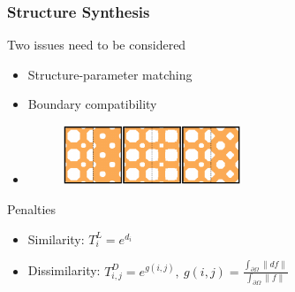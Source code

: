 \documentclass[serif,mathserif]{beamer}
\begin{document}
\begin{frame}
\end{frame}

\begin{frame}
  \frametitle{Structure Synthesis}
  \begin{itemize}
     {
    \item Two issues need to be considered
      \begin{itemize}
      \item Structure-parameter matching
      \item Boundary compatibility
      \item[]
        \begin{figure}
          \includegraphics[width=0.5\textwidth]{img/boundary}
        \end{figure}
      \end{itemize}
    }
     {
    \item Penalties
      \begin{itemize}
      \item Similarity: $T_i^L = e^{d_i}$
      \item Dissimilarity: $T_{i, j}^D = e^{g(i, j)},~g(i, j) = \frac{\int_{\partial \Omega}\|df\|}{\int_{\partial \Omega}\|f\|}$
      \end{itemize}
    }
  \end{itemize}
\end{frame}
\end{document}
